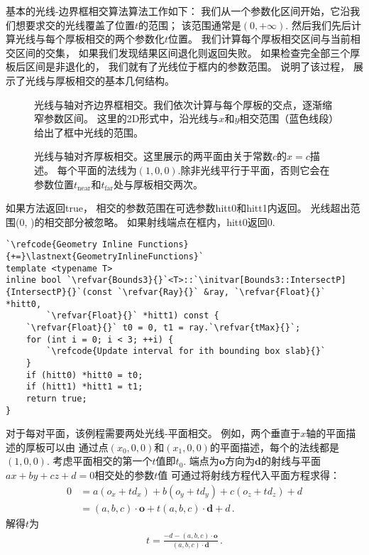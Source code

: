 基本的光线-边界框相交算法算法工作如下：
我们从一个参数化区间开始，它沿我们想要求交的光线覆盖了位置$t$的范围；
该范围通常是$(0,+\infty)$.
然后我们先后计算光线与每个厚板相交的两个参数化$t$位置。
我们计算每个厚板相交区间与当前相交区间的交集，
如果我们发现结果区间退化则返回失败。
如果检查完全部三个厚板后区间是非退化的，
我们就有了光线位于框内的参数范围。
说明了该过程，
展示了光线与厚板相交的基本几何结构。
\begin{figure}[htb]
    \centering
    \caption{光线与轴对齐边界框相交。我们依次计算与每个厚板的交点，逐渐缩窄参数区间。
        这里的2D形式中，沿光线与$x$和$y$相交范围（蓝色线段）给出了框中光线的范围。}
    \label{fig:3.2}
\end{figure}
\begin{figure}[htb]
    \centering
    \caption{光线与轴对齐厚板相交。这里展示的两平面由关于常数$c$的$x=c$描述。
        每个平面的法线为$(1,0,0)$.除非光线平行于平面，否则它会在
        参数位置$t_{\mathrm{near}}$和$t_{\mathrm{far}}$处与厚板相交两次。}
    \label{fig:3.3}
\end{figure}

如果方法返回{\ttfamily true}，
相交的参数范围在可选参数{\ttfamily hitt0}和{\ttfamily hitt1}内返回。
光线超出范围{\ttfamily (0, )}的相交部分被忽略。
如果射线端点在框内，{\ttfamily hitt0}返回$0$.
\begin{lstlisting}
`\refcode{Geometry Inline Functions}{+=}\lastnext{GeometryInlineFunctions}`
template <typename T>
inline bool `\refvar{Bounds3}{}`<T>::`\initvar[Bounds3::IntersectP]{IntersectP}{}`(const `\refvar{Ray}{}` &ray, `\refvar{Float}{}` *hitt0,
        `\refvar{Float}{}` *hitt1) const {
    `\refvar{Float}{}` t0 = 0, t1 = ray.`\refvar{tMax}{}`;
    for (int i = 0; i < 3; ++i) {
        `\refcode{Update interval for ith bounding box slab}{}`
    }
    if (hitt0) *hitt0 = t0;
    if (hitt1) *hitt1 = t1;
    return true;
}
\end{lstlisting}

对于每对平面，该例程需要两处光线-平面相交。
例如，两个垂直于$x$轴的平面描述的厚板可以由
通过点$(x_0,0,0)$和$(x_1,0,0)$的平面描述，每个的法线都是$(1,0,0)$.
考虑平面相交的第一个$t$值即$t_0$.
端点为$\bm o$方向为$\bm d$的射线与平面$ax+by+cz+d=0$相交处的参数$t$值
可通过将射线方程代入平面方程求得：
\begin{align*}
    0 & =a(o_x+td_x)+b(o_y+td_y)+c(o_z+td_z)+d      \\
      & =(a,b,c)\cdot\bm o+t(a,b,c)\cdot\bm d+d\, .
\end{align*}
解得$t$为
\begin{align*}
    t=\frac{-d-(a,b,c)\cdot\bm o}{(a,b,c)\cdot\bm d}\, .
\end{align*}

